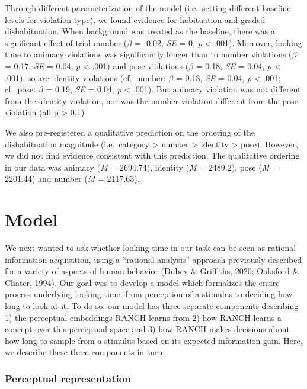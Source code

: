\documentclass[10pt, letterpaper]{article}
\begin{document}
Through different parameterization of the model (i.e.~setting different
baseline levels for violation type), we found evidence for habituation
and graded dishabituation. When background was treated as the baseline,
there was a significant effect of trial number (\(\beta\) = -0.02,
\emph{SE} = 0, \emph{p} \textless{} .001). Moreover, looking time to
animacy violations was significantly longer than to number violations
(\(\beta\) = 0.17, \emph{SE} = 0.04, \emph{p} \textless{} .001) and pose
violations (\(\beta\) = 0.18, \emph{SE} = 0.04, \emph{p} \textless{}
.001), so are identity violations (cf.~number: \(\beta\) = 0.18,
\emph{SE} = 0.04, \emph{p} \textless{} .001; cf.~pose: \(\beta\) = 0.19,
\emph{SE} = 0.04, \emph{p} \textless{} .001). But animacy violation was
not different from the identity violation, nor was the number violation
different from the pose violation (all p \textgreater{} 0.1)

We also pre-registered a qualitative prediction on the ordering of the
dishabituation magnitude (i.e.~category \textgreater{} number
\textgreater{} identity \textgreater{} pose). However, we did not find
evidence consistent with this prediction. The qualitative ordering in
our data was animacy (\emph{M} = 2694.74), identity (\emph{M} = 2489.2),
pose (\emph{M} = 2201.44) and number (\emph{M} = 2117.63).

\hypertarget{model}{%
\section{Model}\label{model}}

We next wanted to ask whether looking time in our task can be seen as
rational information acquisition, using a ``rational analysis'' approach
previously described for a variety of aspects of human behavior (Dubey
\& Griffiths, 2020; Oaksford \& Chater, 1994). Our goal was to develop a
model which formalizes the entire process underlying looking time: from
perception of a stimulus to deciding how long to look at it. To do so,
our model has three separate components describing 1) the perceptual
embeddings RANCH learns from 2) how RANCH learns a concept over this
perceptual space and 3) how RANCH makes decisions about how long to
sample from a stimulus based on its expected information gain. Here, we
describe these three components in turn.

\hypertarget{perceptual-representation}{%
\subsubsection{Perceptual
representation}\label{perceptual-representation}}
\end{document}
